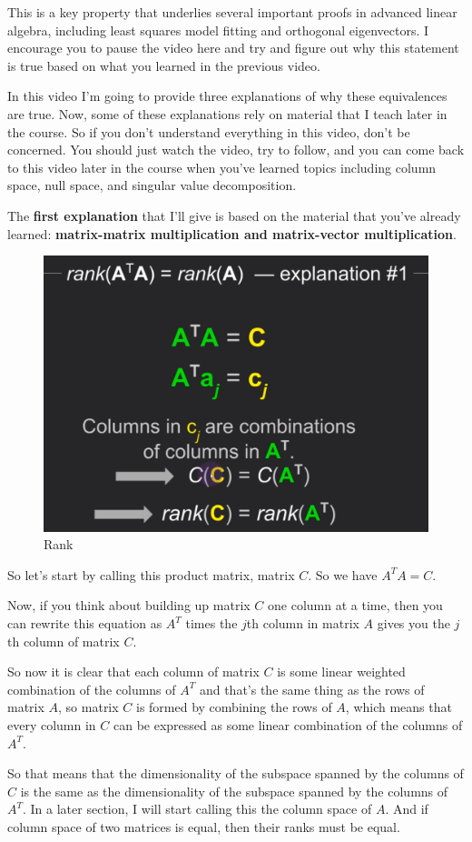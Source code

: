 \documentclass[fleqn,10pt]{olplainarticle}
\theoremstyle{definition}
\theoremstyle{remark}
\begin{document}
This is a key property that underlies several important proofs in advanced linear algebra, including least squares model fitting and orthogonal eigenvectors. I encourage you to pause the video here and try and figure out why this statement is true based on what you learned in the previous video.

In this video I'm going to provide three explanations of why these equivalences are true. Now, some of these explanations rely on material that I teach later in the course. So if you don't understand everything in this video, don't be concerned. You should just watch the video, try to follow, and you can come back to this video later in the course when you've learned topics including column space, null space, and singular value decomposition.

The \textbf{first explanation} that I'll give is based on the material that you've already learned: \textbf{matrix-matrix multiplication and matrix-vector multiplication}.

\begin{figure}[ht]
	\centering
	\includegraphics[width=0.5\linewidth]{images/rank-23.png}
	\caption{Rank}
	\label{fig:rank_23}
\end{figure}

So let's start by calling this product matrix, matrix $C$. So we have $A^TA = C$.

Now, if you think about building up matrix $C$ one column at a time, then you can rewrite this equation as $A^T$ times the $j$th column in matrix $A$ gives you the $j$th column of matrix $C$.

So now it is clear that each column of matrix $C$ is some linear weighted combination of the columns of $A^T$ and that's the same thing as the rows of matrix $A$, so matrix $C$ is formed by combining the rows of $A$, which means that every column in $C$ can be expressed as some linear combination of the columns of $A^T$.

So that means that the dimensionality of the subspace spanned by the columns of $C$ is the same as the dimensionality of the subspace spanned by the columns of $A^T$. In a later section, I will start calling this the column space of $A$. And if column space of two matrices is equal, then their ranks must be equal.
\end{document}

